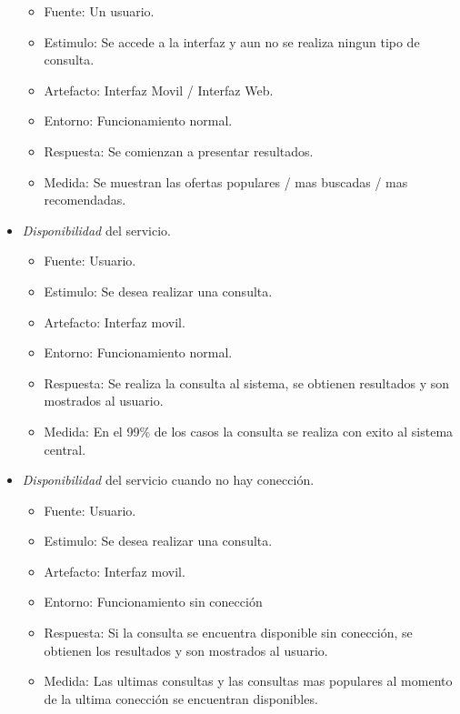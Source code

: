 \begin{itemize}
  \begin{itemize}
  \item
    Fuente: Un usuario.
  \item
    Estimulo: Se accede a la interfaz y aun no se realiza ningun tipo de
    consulta.
  \item
    Artefacto: Interfaz Movil / Interfaz Web.
  \item
    Entorno: Funcionamiento normal.
  \item
    Respuesta: Se comienzan a presentar resultados.
  \item
    Medida: Se muestran las ofertas populares / mas buscadas / mas
    recomendadas.
  \end{itemize}
\item
  \emph{Disponibilidad} del servicio.

  \begin{itemize}
  \item
    Fuente: Usuario.
  \item
    Estimulo: Se desea realizar una consulta.
  \item
    Artefacto: Interfaz movil.
  \item
    Entorno: Funcionamiento normal.
  \item
    Respuesta: Se realiza la consulta al sistema, se obtienen resultados
    y son mostrados al usuario.
  \item
    Medida: En el 99\% de los casos la consulta se realiza con exito al
    sistema central.
  \end{itemize}
\item
  \emph{Disponibilidad} del servicio cuando no hay conección.

  \begin{itemize}
  \item
    Fuente: Usuario.
  \item
    Estimulo: Se desea realizar una consulta.
  \item
    Artefacto: Interfaz movil.
  \item
    Entorno: Funcionamiento sin conección
  \item
    Respuesta: Si la consulta se encuentra disponible sin conección, se
    obtienen los resultados y son mostrados al usuario.
  \item
    Medida: Las ultimas consultas y las consultas mas populares al
    momento de la ultima conección se encuentran disponibles.
  \end{itemize}
\end{itemize}
